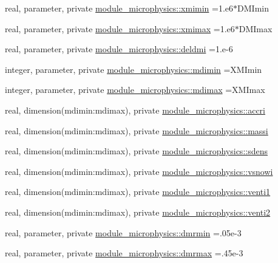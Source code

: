 \begin{DoxyCompactItemize}
\item 
real, parameter, private \hyperlink{namespacemodule__microphysics_ac355dc0d92140f99522cb35dc025e9b3}{module\+\_\+microphysics\+::xmimin} =1.e6$\ast$D\+M\+Imin
\item 
real, parameter, private \hyperlink{namespacemodule__microphysics_ae678585401e3fd39ce21f225ae430677}{module\+\_\+microphysics\+::xmimax} =1.e6$\ast$D\+M\+Imax
\item 
real, parameter, private \hyperlink{namespacemodule__microphysics_a50ee0e811da6e52c191f977407e9e47d}{module\+\_\+microphysics\+::deldmi} =1.e-\/6
\item 
integer, parameter, private \hyperlink{namespacemodule__microphysics_a81bcf203ed1a75b10ea2c7f97ac56a21}{module\+\_\+microphysics\+::mdimin} =X\+M\+Imin
\item 
integer, parameter, private \hyperlink{namespacemodule__microphysics_a28b728213c1425c1bd5c05c9a469b92a}{module\+\_\+microphysics\+::mdimax} =X\+M\+Imax
\item 
real, dimension(mdimin\+:mdimax), private \hyperlink{namespacemodule__microphysics_a85112c2881ca373d648a39bd0c5843fa}{module\+\_\+microphysics\+::accri}
\item 
real, dimension(mdimin\+:mdimax), private \hyperlink{namespacemodule__microphysics_a399ef7965cf1f4f6e4aef482e33f9b16}{module\+\_\+microphysics\+::massi}
\item 
real, dimension(mdimin\+:mdimax), private \hyperlink{namespacemodule__microphysics_ab31a2c459480d3b9ba2388d3f60db179}{module\+\_\+microphysics\+::sdens}
\item 
real, dimension(mdimin\+:mdimax), private \hyperlink{namespacemodule__microphysics_acd06af071ee4f0a5bb4599f239916dd7}{module\+\_\+microphysics\+::vsnowi}
\item 
real, dimension(mdimin\+:mdimax), private \hyperlink{namespacemodule__microphysics_a420fb71de46ebdf9a097147bf9f9debe}{module\+\_\+microphysics\+::venti1}
\item 
real, dimension(mdimin\+:mdimax), private \hyperlink{namespacemodule__microphysics_a340e6633b234e32289115c3ff08277c5}{module\+\_\+microphysics\+::venti2}
\item 
real, parameter, private \hyperlink{namespacemodule__microphysics_a67a841cda9f172633fa4895d1a3433e7}{module\+\_\+microphysics\+::dmrmin} =.\+05e-\/3
\item 
real, parameter, private \hyperlink{namespacemodule__microphysics_a5faae0c4f54f72f04b2874f5588276f5}{module\+\_\+microphysics\+::dmrmax} =.\+45e-\/3
\item 

\end{DoxyCompactItemize}
